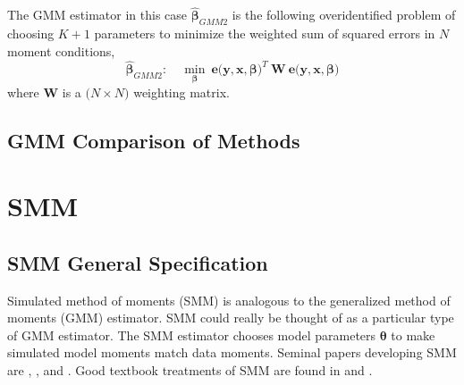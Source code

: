\documentclass[letterpaper,12pt]{article}
\theoremstyle{definition}
\begin{document}
    The GMM estimator in this case $\bm{\hat{\beta}}_{GMM2}$ is the following overidentified problem of choosing $K+1$ parameters to minimize the weighted sum of squared errors in $N$ moment conditions,
    \begin{equation}\label{EqGMMdef2}
      \bm{\hat{\beta}}_{GMM2}:\quad \min_{\bm{\beta}}\:\bm{e}\bigl(\bm{y},\bm{x},\bm{\beta}\bigr)^T\:\bm{W}\:\bm{e}\bigl(\bm{y},\bm{x},\bm{\beta}\bigr)
    \end{equation}
    where $\bm{W}$ is a $\bigl(N\times N\bigr)$ weighting matrix.


  \subsection{GMM Comparison of Methods}\label{SecGMMcomp}



\section{SMM}\label{SecSMM}

  \setcounter{subsection}{-1}

  \subsection{SMM General Specification}\label{SecSMMgen}

    Simulated method of moments (SMM) is analogous to the generalized method of moments (GMM) estimator. SMM could really be thought of as a particular type of GMM estimator. The SMM estimator chooses model parameters $\bm{\theta}$ to make simulated model moments match data moments. Seminal papers developing SMM are \citet{McFadden:1989}, \citet{LeeIngram:1991}, and \citet{DuffieSingleton:1993}. Good textbook treatments of SMM are found in \citet[pp.87-100]{AddaCooper:2003} and \citet[pp. 383-394]{DavidsonMacKinnon:2004}.
\end{document}
